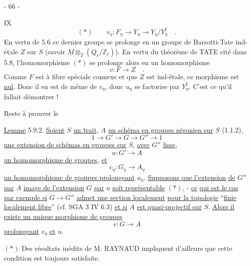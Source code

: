\begin{center}- 66 -\end{center}
\hfill IX
\[
(*)\qquad v_\eta:F_\eta\longrightarrow Y_\eta\longrightarrow Y_\eta/Y_\eta^{\mathrm f}\quad .
\]
En vertu de 5.6 ce dernier groupe se prolonge en un groupe de Barsotti-Tate
ind-étale $Z$ sur $S$ (savoir $\underline M\otimes_{\mathbb Z}(Q_\ell/\mathbb Z_\ell)$). En vertu du théorème de TATE
cité dans 5.8, l'homomorphisme $(*)$ se prolonge alors en un homomorphisme
\[
v:F\longrightarrow Z\quad .
\]
Comme $F$ est à fibre spéciale connexe et que $Z$ est ind-étale, ce morphisme
est \uline{nul}. Donc il en est de même de $v_\eta$, donc $u_\eta$ se factorise par $Y_\eta^{\mathrm f}$.
C'est ce qu'il fallait démontrer !

Reste à prouver le

\uline{Lemme} 5.9.2. \uline{Soient} $S$ \uline{un trait}, $A$ \uline{un schéma en groupes néronien sur}
$S$ (1.1.2),
\[
1\longrightarrow G'\longrightarrow G\longrightarrow G''\longrightarrow 1
\]
\uline{une extension de schémas en groupes sur} $S$, \uline{avec} $G''$ \uline{lisse},
\[
u:G'\longrightarrow A
\]
\uline{un homomorphisme de groupes}, \uline{et}
\[
v_\eta:G_\eta\longrightarrow A_\eta
\]
\uline{un homomorphisme de groupes prolongeant} $u_\eta$. \uline{Supposons que l'extension}
\uline{de} $G''$ \uline{par} $A$ \uline{image de l'extension} $G$ \uline{par} $u$ \uline{soit représentable} $(*)$, - \uline{ce}
\uline{qui est le cas par exemple si} $G\longrightarrow G''$ \uline{admet une section localement}
\uline{pour la topologie} ``\uline{finie localement libre}'' (cf. SGA 3 IV 6.3) \uline{et si} $A$
\uline{est quasi-projectif sur} $S$. \uline{Alors il existe un unique morphisme de groupes}
\[
v:G\longrightarrow A
\]
\uline{prolongeant} $v_\eta$ \uline{et} $u$.

$(*)$ Des résultats inédits de M. RAYNAUD impliquent d'ailleurs que cette
condition est toujours satisfaite.

